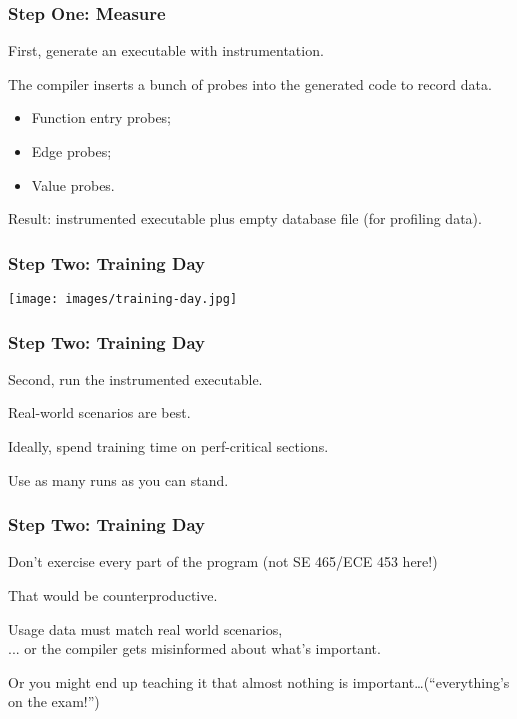 \begin{frame}
\frametitle{Step One: Measure}



First, generate an executable with instrumentation. 

The compiler inserts a bunch of probes into the generated code to record data. 
\begin{itemize}
\item Function entry probes;
\item Edge probes;
\item Value probes.
\end{itemize}

Result: instrumented executable plus empty database file (for profiling data).


\end{frame}



\begin{frame}
\frametitle{Step Two: Training Day}

\begin{center}
	\texttt{[image: images/training-day.jpg]}
\end{center}

\end{frame}


\begin{frame}
\frametitle{Step Two: Training Day}



Second, run the instrumented executable.

Real-world scenarios are best.

Ideally, spend training time on perf-critical sections. 

Use as many runs as you can stand.

\end{frame}



\begin{frame}
\frametitle{Step Two: Training Day}



Don't exercise every part of the program (not SE 465/ECE 453 here!)

That would be counterproductive.

Usage data must match real world scenarios,\\
... or the compiler gets misinformed about what's important. 

Or you might end up teaching it that almost nothing
is important\ldots (``everything's on the exam!'')


\end{frame}



